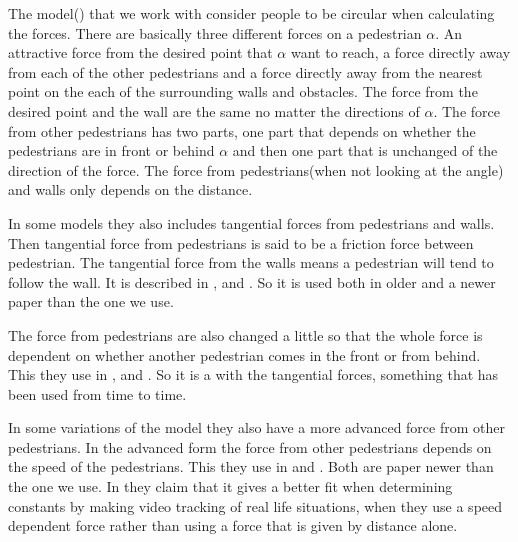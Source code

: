 The model(\cite{self-org}) that we work with consider people to be circular when calculating the forces. There are basically three different forces on a pedestrian $\alpha$. An attractive force from the desired point that $\alpha$ want to reach, a force directly away from each of the other pedestrians and a force directly away from the nearest point on the each of the surrounding  walls and obstacles. The force from the desired point and the wall are the same no matter the directions of $\alpha$. The force from other pedestrians has two parts, one part that depends on whether the pedestrians are in front or behind $\alpha$ and then one part that is unchanged of the direction of the force. The force from pedestrians(when not looking at the angle) and walls only depends on the distance. 

In some models they also includes tangential forces from pedestrians and walls. Then tangential force from pedestrians is said to be a friction force between pedestrian. The tangential force from the walls means a pedestrian will tend to follow the wall. It is described in \cite{helbing00},  and \cite{HelbingNew}. So it is used both in older and a newer paper than the one we use.

The force from pedestrians are also changed a little so that the whole force is dependent on whether another pedestrian comes in the front or from behind. This they use in \cite{ABconstant}, \cite{HelbingNew} and  \cite{helbing00}. So it is a with the tangential forces, something that has been used from time to time. 

In some variations of the model they also have a more advanced force from other pedestrians. In the advanced form the force from other pedestrians depends on the speed of the pedestrians. This they use in \cite{HelbingNew} and \cite{ABconstant}.  Both are paper newer than the one we use. In \cite{ABconstant} they claim that it gives a better fit when determining constants by making video tracking of real life situations, when they use a speed dependent force rather than using a force that is given by distance alone. 







